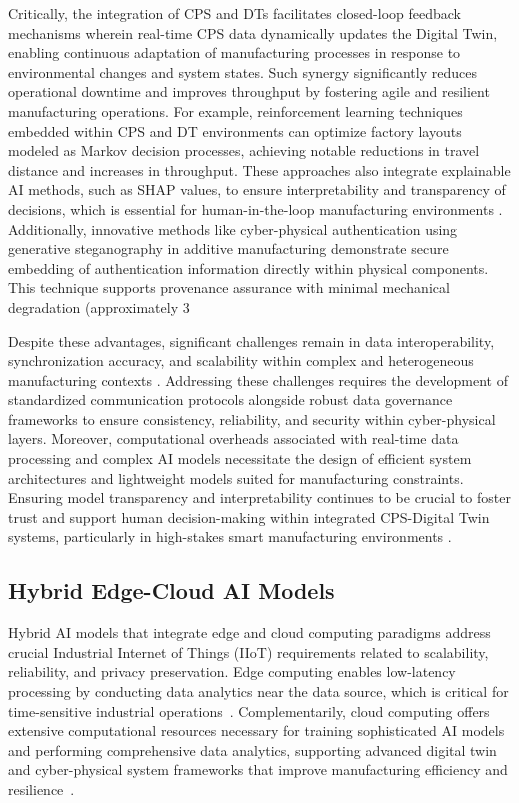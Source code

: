 \documentclass[sigconf]{acmart}
\begin{document}
Critically, the integration of CPS and DTs facilitates closed-loop feedback mechanisms wherein real-time CPS data dynamically updates the Digital Twin, enabling continuous adaptation of manufacturing processes in response to environmental changes and system states. Such synergy significantly reduces operational downtime and improves throughput by fostering agile and resilient manufacturing operations. For example, reinforcement learning techniques embedded within CPS and DT environments can optimize factory layouts modeled as Markov decision processes, achieving notable reductions in travel distance and increases in throughput. These approaches also integrate explainable AI methods, such as SHAP values, to ensure interpretability and transparency of decisions, which is essential for human-in-the-loop manufacturing environments \cite{ref9}. Additionally, innovative methods like cyber-physical authentication using generative steganography in additive manufacturing demonstrate secure embedding of authentication information directly within physical components. This technique supports provenance assurance with minimal mechanical degradation (approximately 3%

Despite these advantages, significant challenges remain in data interoperability, synchronization accuracy, and scalability within complex and heterogeneous manufacturing contexts \cite{ref13}. Addressing these challenges requires the development of standardized communication protocols alongside robust data governance frameworks to ensure consistency, reliability, and security within cyber-physical layers. Moreover, computational overheads associated with real-time data processing and complex AI models necessitate the design of efficient system architectures and lightweight models suited for manufacturing constraints. Ensuring model transparency and interpretability continues to be crucial to foster trust and support human decision-making within integrated CPS-Digital Twin systems, particularly in high-stakes smart manufacturing environments \cite{ref12}.

\subsection{Hybrid Edge-Cloud AI Models}

Hybrid AI models that integrate edge and cloud computing paradigms address crucial Industrial Internet of Things (IIoT) requirements related to scalability, reliability, and privacy preservation. Edge computing enables low-latency processing by conducting data analytics near the data source, which is critical for time-sensitive industrial operations~\cite{ref15}. Complementarily, cloud computing offers extensive computational resources necessary for training sophisticated AI models and performing comprehensive data analytics, supporting advanced digital twin and cyber-physical system frameworks that improve manufacturing efficiency and resilience~\cite{ref22}.
\end{document}
